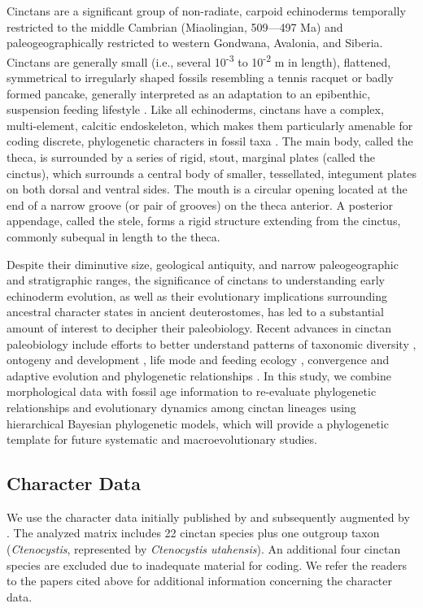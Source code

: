 \documentclass{article}
\begin{document}
Cinctans are a significant group of non-radiate, carpoid echinoderms temporally restricted to the middle Cambrian (Miaolingian, 509—497 Ma) and paleogeographically restricted to western Gondwana, Avalonia, and Siberia. Cinctans are generally small (i.e., several 10\textsuperscript{-3} to 10\textsuperscript{-2} m in length), flattened, symmetrical to irregularly shaped fossils resembling a tennis racquet or badly formed pancake, generally interpreted as an adaptation to an epibenthic, suspension feeding lifestyle \citep{Rahman2009a, RahmanEtAl2015}.  Like all echinoderms, cinctans have a complex, multi-element, calcitic endoskeleton, which makes them particularly amenable for coding discrete, phylogenetic characters in fossil taxa \citep{SmithZamora2009}. The main body, called the theca, is surrounded by a series of rigid, stout, marginal plates (called the cinctus), which surrounds a central body of smaller, tessellated, integument plates on both dorsal and ventral sides. The mouth is a circular opening located at the end of a narrow groove (or pair of grooves) on the theca anterior. A posterior appendage, called the stele, forms a rigid structure extending from the cinctus, commonly subequal in length to the theca. 

Despite their diminutive size, geological antiquity, and narrow paleogeographic and stratigraphic ranges, the significance of cinctans to understanding early echinoderm evolution, as well as their evolutionary implications surrounding ancestral character states in ancient deuterostomes, has led to a substantial amount of interest to decipher their paleobiology. Recent advances in cinctan paleobiology include efforts to better understand patterns of taxonomic diversity \citep{ZamoraAlvaro2010}, ontogeny and development \citep{ZamoraRahmanSmith2013}, life mode and feeding ecology \citep{Rahman2009b, RahmanEtAl2015}, convergence and adaptive evolution \citep{ZamoraSmith2008} and phylogenetic relationships \citep{Freidrich1993, Sdzuy1993, SmithZamora2009, ZamoraRahmanSmith2013}. In this study, we combine morphological data with fossil age information to re-evaluate phylogenetic relationships and evolutionary dynamics among cinctan lineages using hierarchical Bayesian phylogenetic models, which will provide a phylogenetic template for future systematic and macroevolutionary studies.

\subsection{Character Data}
We use the character data initially published by \citep{SmithZamora2009} and subsequently augmented by \citep{ZamoraRahmanSmith2013}.  The analyzed matrix includes 22 cinctan species plus one outgroup taxon (\textit{Ctenocystis}, represented by \textit{Ctenocystis utahensis}). An additional four cinctan species are excluded due to inadequate material for coding.  We refer the readers to the papers cited above for additional information concerning the character data.
\end{document}
